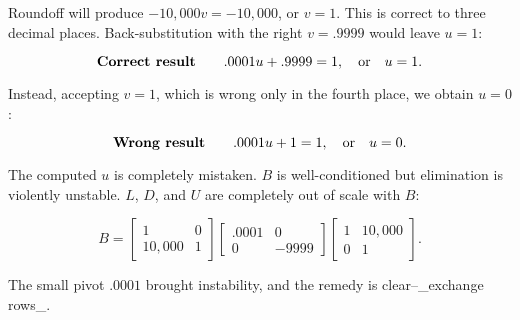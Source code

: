 Roundoff will produce \(-10,000v=-10,000\), or \(v=1\). This is correct to three decimal places. Back-substitution with the right \(v=.9999\) would leave \(u=1\):

\[\mbox{\bf Correct result}\qquad.0001u+.9999=1,\quad\mbox{or}\quad u=1.\]

Instead, accepting \(v=1\), which is wrong only in the fourth place, we obtain \(u=0\):

\[\mbox{\bf Wrong result}\qquad.0001u+1=1,\quad\mbox{or}\quad u=0.\]

The computed \(u\) is completely mistaken. \(B\) is well-conditioned but elimination is violently unstable. \(L\), \(D\), and \(U\) are completely out of scale with \(B\):

\[B=\begin{bmatrix}1&0\\ 10,000&1\end{bmatrix}\begin{bmatrix}.0001&0\\ 0&-9999\end{bmatrix}\begin{bmatrix}1&10,000\\ 0&1\end{bmatrix}.\]

The small pivot \(.0001\) brought instability, and the remedy is clear--_exchange rows_.

 